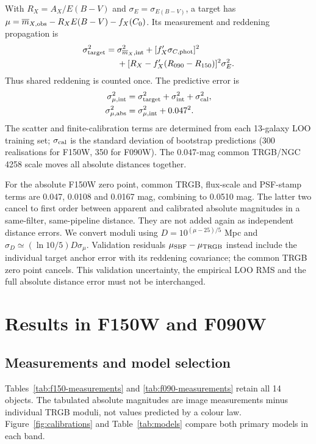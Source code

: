 \documentclass[nodoi,nocopyright]{pas}
\newcommand{\mbar}{\overline{m}}
\begin{document}
With $R_X=A_X/E(B-V)$ and $\sigma_E=\sigma_{E(B-V)}$, a target has
$\mu=\mbar_{X,\rm obs}-R_XE(B-V)-f_X(C_0)$. Its measurement
and reddening propagation is
\begin{align}
 \sigma_{\rm target}^2={}&\sigma_{\mbar_X,\rm int}^2+
 [f'_X\sigma_{C,\rm phot}]^2 \nonumber\\
 &+[R_X-f'_X(R_{090}-R_{150})]^2\sigma_E^2.
 \label{eq:target}
\end{align}
Thus shared reddening is counted once. The predictive error is
\begin{align}
 \sigma_{\mu,\rm int}^2&=\sigma_{\rm target}^2+
 \sigma_{\rm int}^2+\sigma_{\rm cal}^2,\\
 \sigma_{\mu,\rm abs}^2&=\sigma_{\mu,\rm int}^2+0.047^2.
 \label{eq:distance-errors}
\end{align}
The scatter and finite-calibration terms are determined from each
13-galaxy LOO training set; $\sigma_{\rm cal}$ is the standard deviation
of bootstrap predictions (300 realisations for F150W, 350 for F090W).
The 0.047-mag common TRGB/NGC 4258 scale \citep{Reid2019,Chazov2026} moves
all absolute distances together.

For the absolute F150W zero point, common TRGB, flux-scale and PSF-stamp
terms are 0.047, 0.0108 and 0.0167 mag, combining to 0.0510 mag.
The latter two cancel to first order between apparent and calibrated
absolute magnitudes in a same-filter, same-pipeline distance.
They are not added again as independent distance errors.
We convert moduli using
$D=10^{(\mu-25)/5}$ Mpc and
$\sigma_D\simeq(\ln10/5)D\sigma_\mu$.
Validation residuals $\mu_{\rm SBF}-\mu_{\rm TRGB}$ instead include the
individual target anchor error with its reddening covariance; the common
TRGB zero point cancels. This validation uncertainty, the empirical LOO
RMS and the full absolute distance error must not be interchanged.

\section{Results in F150W and F090W}
\label{sec:results}

\subsection{Measurements and model selection}

Tables~\ref{tab:f150-measurements} and \ref{tab:f090-measurements} retain
all 14 objects. The tabulated absolute magnitudes are image measurements
minus individual TRGB moduli, not values predicted by a colour law.
Figure~\ref{fig:calibrations} and Table~\ref{tab:models} compare both
primary models in each band.
\end{document}
